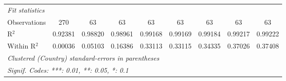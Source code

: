 \begin{table}[htbp]
\begin{tabular}{lcccccccc}
      \emph{Fit statistics}\\
      Observations                                                                       & 270      & 63       & 63             & 63             & 63             & 63             & 63             & 63\\  
      R$^2$                                                                              & 0.92381  & 0.98820  & 0.98961        & 0.99168        & 0.99169        & 0.99184        & 0.99217        & 0.99222\\  
      Within R$^2$                                                                       & 0.00036  & 0.05103  & 0.16386        & 0.33113        & 0.33115        & 0.34335        & 0.37026        & 0.37408\\  
      \midrule \midrule
      \multicolumn{9}{l}{\emph{Clustered (Country) standard-errors in parentheses}}\\
      \multicolumn{9}{l}{\emph{Signif. Codes: ***: 0.01, **: 0.05, *: 0.1}}\\
   \end{tabular}
\end{table}


